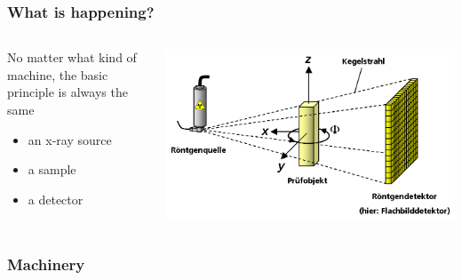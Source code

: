 \renewcommand{\imagewidth}{\linewidth}
 \begin{frame}
 	\frametitle{What is happening?}
 	\begin{columns}%
 		\begin{column}{0.5\linewidth}%
 			No matter what kind of machine, the basic principle is always the same
 			\begin{itemize}
 				\item an x-ray source
 				\item a sample
 				\item a detector
 			\end{itemize}
 		\end{column}%
 		\begin{column}{0.5\linewidth}%
 			\centering%
 			\includegraphics[width=\imagewidth]{./images/3D_Computed_Tomography}%
 		\end{column}%
 	\end{columns}%
 \end{frame}

 \begin{frame}
 	\frametitle{Machinery}
 	\begin{columns}
 		\begin{column}{0.5\linewidth}
 			\centering%
 		\end{column}
 		\begin{column}{0.5\linewidth}
 			\centering%
 			\only<2|handout:1>{}%
			\only<1>{}%
 			\only<3|handout:1>{}%
 		\end{column}
 	\end{columns}
 \end{frame}

